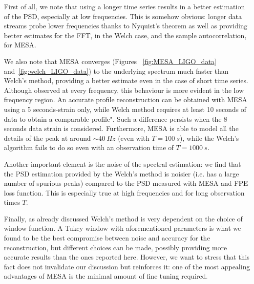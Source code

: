 \documentclass[epj,nopacs]{svjour}
\begin{document}
First of all, we note that using a longer time series results in a better estimation of the PSD, especially at low frequencies. 
This is somehow obvious: longer data streams probe lower frequencies thanks to Nyquist's theorem as well as providing better estimates for the FFT, in the Welch case, and the sample autocorrelation, for MESA.

We also note that MESA converges (Figures ~\ref{fig:MESA_LIGO_data} and~\ref{fig:welch_LIGO_data}) to the underlying spectrum much faster than Welch's method, providing a better estimate even in the case of short time series. Although observed at every frequency, this behaviour is more evident in the low frequency region. An accurate profile reconstruction can be obtained with MESA using a 5 seconds-strain only,  while Welch method requires at least 10 seconds of data to obtain a comparable profile". Such a difference persists when the 8 seconds data strain is considered. 
Furthermore, MESA is able to model all the details of the peak at around $\sim \SI{40}{Hz}$ (even with $T=\SI{100}{s}$), while the Welch's algorithm fails to do so even with an observation time of $T=\SI{1000}{s}$.

Another important element is the noise of the spectral estimation: we find that the PSD estimation provided by the Welch's method is noisier (i.e. has a large number of spurious peaks) compared to the PSD measured with MESA and FPE loss function. This is especially true at high frequencies and for long observation times $T$.

Finally, as already discussed Welch's method is very dependent on the choice of window function. 
A Tukey window with aforementioned parameters is what we found to be the best compromise between noise 
and accuracy for the reconstruction, but different choices can be made, possibly providing more accurate results than the ones reported here. 
However, we want to stress that this fact does not invalidate our discussion but reinforces it: one of the most appealing advantages of MESA is the minimal amount of fine tuning required.
\end{document}
